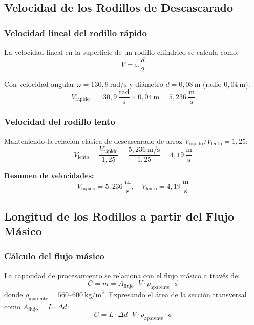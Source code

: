 \subsection{Velocidad de los Rodillos de Descascarado}

\subsubsection{Velocidad lineal del rodillo rápido}
La velocidad lineal en la superficie de un rodillo cilíndrico se calcula como:
\begin{equation}
V = \omega\, \frac{d}{2}
\label{eq:vlineal}
\end{equation}

Con velocidad angular $\omega = 130{,}9\ \text{rad/s}$ y diámetro $d = 0{,}08\ \text{m}$ (radio $0{,}04\ \text{m}$):
\begin{equation}
V_{\text{rápido}} = 130{,}9\ \frac{\text{rad}}{\text{s}} \times 0{,}04\ \text{m} = 5{,}236\ \frac{\text{m}}{\text{s}}
\end{equation}

\subsubsection{Velocidad del rodillo lento}
Manteniendo la relación clásica de descascarado de arroz $V_{\text{rápido}}/V_{\text{lento}} = 1{,}25$:
\begin{equation}
V_{\text{lento}} = \frac{V_{\text{rápido}}}{1{,}25} = \frac{5{,}236\ \text{m/s}}{1{,}25} = 4{,}19\ \frac{\text{m}}{\text{s}}
\end{equation}

\noindent\textbf{Resumen de velocidades:}
\begin{equation*}
V_{\text{rápido}} = 5{,}236\ \frac{\text{m}}{\text{s}}, \quad V_{\text{lento}} = 4{,}19\ \frac{\text{m}}{\text{s}}
\end{equation*}

\subsection{Longitud de los Rodillos a partir del Flujo Másico}

\subsubsection{Cálculo del flujo másico}
La capacidad de procesamiento se relaciona con el flujo másico a través de:
\begin{equation}
C = \dot{m} = A_{\text{flujo}} \cdot V \cdot \rho_{\text{aparente}} \cdot \phi
\label{eq:flujo}
\end{equation}
\noindent donde $\rho_{\text{aparente}} = 560$--$600\ \text{kg/m}^{3}$. Expresando el área de la sección transversal como $A_{\text{flujo}} = L \cdot \Delta d$:
\begin{equation}
C = L \cdot \Delta d \cdot V \cdot \rho_{\text{aparente}} \cdot \phi
\end{equation}


